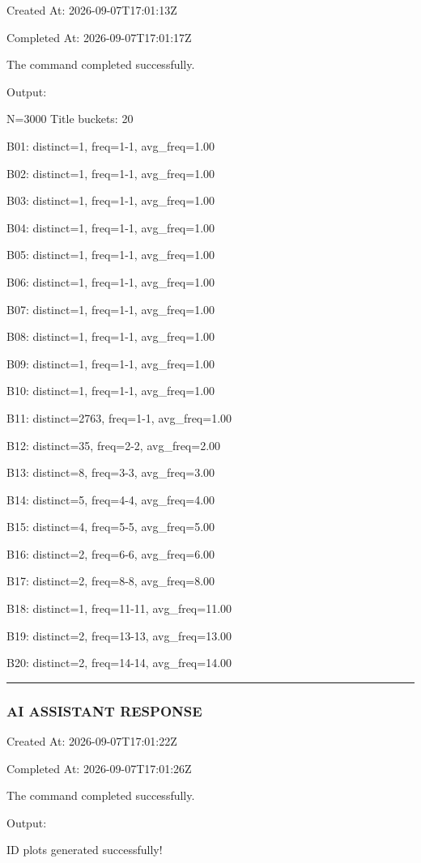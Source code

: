 \documentclass[11pt,a4paper]{article}
\begin{document}
Created At: 2026-09-07T17:01:13Z

Completed At: 2026-09-07T17:01:17Z


The command completed successfully.

Output:

N=3000 Title buckets: 20

B01: distinct=1, freq=1-1, avg\_freq=1.00

B02: distinct=1, freq=1-1, avg\_freq=1.00

B03: distinct=1, freq=1-1, avg\_freq=1.00

B04: distinct=1, freq=1-1, avg\_freq=1.00

B05: distinct=1, freq=1-1, avg\_freq=1.00

B06: distinct=1, freq=1-1, avg\_freq=1.00

B07: distinct=1, freq=1-1, avg\_freq=1.00

B08: distinct=1, freq=1-1, avg\_freq=1.00

B09: distinct=1, freq=1-1, avg\_freq=1.00

B10: distinct=1, freq=1-1, avg\_freq=1.00

B11: distinct=2763, freq=1-1, avg\_freq=1.00

B12: distinct=35, freq=2-2, avg\_freq=2.00

B13: distinct=8, freq=3-3, avg\_freq=3.00

B14: distinct=5, freq=4-4, avg\_freq=4.00

B15: distinct=4, freq=5-5, avg\_freq=5.00

B16: distinct=2, freq=6-6, avg\_freq=6.00

B17: distinct=2, freq=8-8, avg\_freq=8.00

B18: distinct=1, freq=11-11, avg\_freq=11.00

B19: distinct=2, freq=13-13, avg\_freq=13.00

B20: distinct=2, freq=14-14, avg\_freq=14.00


\hrule

\subsubsection{AI ASSISTANT RESPONSE}

Created At: 2026-09-07T17:01:22Z

Completed At: 2026-09-07T17:01:26Z


The command completed successfully.

Output:

ID plots generated successfully!
\end{document}
